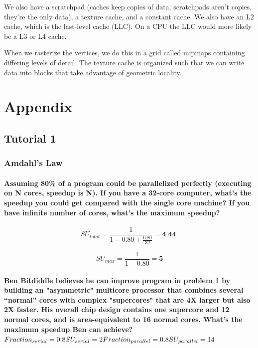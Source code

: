 \documentclass{article}
\renewcommand\appendix{\par
  \setcounter{section}{0}
  \setcounter{subsection}{0}
  \setcounter{figure}{0}
  \setcounter{table}{0}
  \renewcommand\thesection{Appendix \Alph{section}}
  \renewcommand\thefigure{\Alph{section}\arabic{figure}}
  \renewcommand\thetable{\Alph{section}\arabic{table}}
}
\begin{document}
We also have a scratchpad (caches keep copies of data, scratchpads aren't copies, they're the only data), a texture cache, and a constant cache. We also have an L2 cache, which is the last-level cache (LLC). On a CPU the LLC would more likely be a L3 or L4 cache. 

When we rasterize the vertices, we do this in a grid called mipmaps containing differing levels of detail. The texture cache is organized such that we can write data into blocks that take advantage of geometric locality. 








\newpage

 
\pagebreak


\appendix
\onehalfspacing
\section*{Appendix}
\renewcommand{\thesubsection}{\Alph{subsection}}

\subsection{Tutorial 1}

\subsubsection{Amdahl's Law}

\paragraph{Assuming 80\% of a program could be parallelized perfectly (executing on N cores, speedup is N). If
you have a 32-core computer, what's the speedup you could get compared with the single core machine?
If you have infinite number of cores, what's the maximum speedup?}


$$
SU_{total} = \frac{1}{1-0.80+\frac{0.80}{32}} = \textbf{4.44 }
$$

$$
SU_{max} = \frac{1}{1-0.80} = \textbf{5}
$$


\paragraph{Ben Bitdiddle believes he can improve program in problem 1 by building an "asymmetric" multicore
processor that combines several “normal” cores with complex "supercores" that are 4X larger but also
2X faster. His overall chip design contains one supercore and 12 normal cores, and is area-equivalent
to 16 normal cores. What's the maximum speedup Ben can achieve?  $ \\ Fraction_{serial} = 0.8 \\ SU_{serial} = 2 \\ Fraction_{parallel} = 0.8 \\ SU_{parallel} = 14$}
\end{document}
